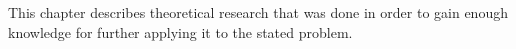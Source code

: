\documentclass[../../main]{subfiles}
\begin{document}
This chapter describes theoretical research that was done in order to gain enough knowledge for further applying it to the stated problem.


\newpage


\newpage
\end{document}
